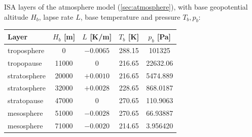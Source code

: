 ISA layers of the atmosphere model (\autoref{sec:atmosphere}), with base geopotential altitude
$H_b$, lapse rate $L$, base temperature and pressure $T_b, p_b$:
\begin{center}
\small
\begin{tabular}{l c c c c}
\hline
Layer & $H_b$ [m] & $L$ [K/m] & $T_b$ [K] & $p_b$ [Pa] \\
\hline
troposphere  & 0     & $-0.0065$ & 288.15 & 101325   \\
tropopause   & 11000 & $0$       & 216.65 & 22632.06 \\
stratosphere & 20000 & $+0.0010$ & 216.65 & 5474.889 \\
stratosphere & 32000 & $+0.0028$ & 228.65 & 868.0187 \\
stratopause  & 47000 & $0$       & 270.65 & 110.9063 \\
mesosphere   & 51000 & $-0.0028$ & 270.65 & 66.93887 \\
mesosphere   & 71000 & $-0.0020$ & 214.65 & 3.956420 \\
\hline
\end{tabular}
\label{tab:isa_layers}
\end{center}
